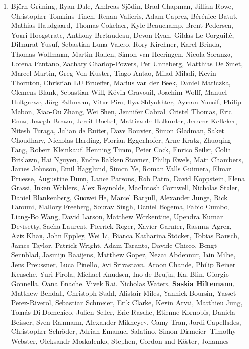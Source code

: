 \begin{enumerate}
\item Björn Grüning, Ryan  Dale, Andreas  Sjödin, Brad  Chapman, Jillian  Rowe, Christopher  Tomkins-Tinch, Renan  Valieris, Adam  Caprez, Bérénice  Batut, Mathias  Haudgaard, Thomas  Cokelaer, Kyle  Beauchamp, Brent  Pedersen, Youri  Hoogstrate, Anthony  Bretaudeau, Devon  Ryan, Gildas  Le Corguillé, Dilmurat  Yusuf, Sebastian  Luna-Valero, Rory  Kirchner, Karel  Brinda, Thomas  Wollmann, Martin  Raden, Simon  van Heeringen, Nicola  Soranzo, Lorena  Pantano, Zachary  Charlop-Powers, Per  Unneberg, Matthias  De Smet, Marcel  Martin, Greg  Von Kuster, Tiago  Antao, Milad  Miladi, Kevin  Thornton, Christian LU   Brueffer, Marius  van der Beek, Daniel  Maticzka, Clemens  Blank, Sebastian  Will, Kévin  Gravouil, Joachim  Wolff, Manuel  Holtgrewe, Jörg  Fallmann, Vitor  Piro, Ilya  Shlyakhter, Ayman  Yousif, Philip  Mabon, Xiao-Ou  Zhang, Wei  Shen, Jennifer  Cabral, Cristel  Thomas, Eric  Enns, Joseph  Brown, Jorrit  Boekel, Mattias  de Hollander, Jerome  Kelleher, Nitesh  Turaga, Julian  de Ruiter, Dave  Bouvier, Simon  Gladman, Saket  Choudhary, Nicholas  Harding, Florian  Eggenhofer, Arne  Kratz, Zhuoqing  Fang, Robert  Kleinkauf, Henning  Timm, Peter  Cock, Enrico  Seiler, Colin  Brislawn, Hai  Nguyen, Endre  Bakken Stovner, Philip  Ewels, Matt  Chambers, James  Johnson, Emil  Hägglund, Simon  Ye, Roman  Valls Guimera, Elmar  Pruesse, Augustine  Dunn, Lance  Parsons, Rob  Patro, David  Koppstein, Elena  Grassi, Inken  Wohlers, Alex  Reynolds, MacIntosh  Cornwell, Nicholas  Stoler, Daniel  Blankenberg, Guowei  He, Marcel  Bargull, Alexander  Junge, Rick  Farouni, Mallory  Freeberg, Sourav  Singh, Daniel  Bogema, Fabio  Cumbo, Liang-Bo  Wang, David  Larson, Matthew  Workentine, Upendra  Kumar Devisetty, Sacha  Laurent, Pierrick  Roger, Xavier  Garnier, Rasmus  Agren, Aziz  Khan, John  Eppley, Wei  Li, Bianca Katharina  Stöcker, Tobias  Rausch, James  Taylor, Patrick  Wright, Adam  Taranto, Davide  Chicco, Bengt  Sennblad, Jasmijn  Baaijens, Matthew  Gopez, Nezar  Abdennur, Iain  Milne, Jens  Preussner, Luca  Pinello, Avi  Srivastava, Aroon  Chande, Philip Reiner  Kensche, Yuri  Pirola, Michael  Knudsen, Ino  de Bruijn, Kai  Blin, Giorgio  Gonnella, Oana  Enache, Vivek  Rai, Nicholas  Waters, \textbf{Saskia Hiltemann}, Matthew Bendall, Christoph  Stahl, Alistair  Miles, Yannick  Boursin, Yasset  Perez-Riverol, Sebastian  Schmeier, Erik  Clarke, Kevin  Arvai, Matthieu  Jung, Tomás  Di Domenico, Julien  Seiler, Eric  Rasche, Etienne  Kornobis, Daniela  Beisser, Sven  Rahmann, Alexander  Mikheyev, Camy  Tran, Jordi  Capellades, Christopher  Schröder, Adrian Emanuel  Salatino, Simon  Dirmeier, Timothy  Webster, Oleksandr  Moskalenko, Stephen, Gordon and Köster, Johannes {\color{chaptergrey}{Bioconda: A sustainable and comprehensive software distribution for the life sciences.}}


\end{enumerate}

